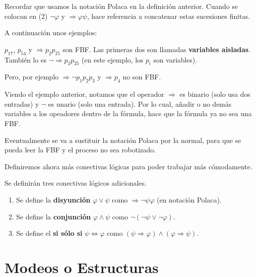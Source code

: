\documentclass[12pt]{report}
\newcounter{it}
\theoremstyle{largebreak}
\begin{document}
    \begin{obs}
        Recordar que usamos la notación Polaca en la definición anterior. Cuando se colocan en (2) $\neg\varphi$ y $\Rightarrow\varphi\psi$, hace referencia a concatenar estas sucesiones finitas.
    \end{obs}

    A continuación unos ejemplos:
    
    \begin{exa}
        $p_{17}$, $p_{54}$ y $\Rightarrow p_2p_{25}$ son FBF. Las primeras dos son llamadas \textbf{variables aisladas}. También lo es $\neg \Rightarrow p_2p_{25}$ (en este ejemplo, los $p_i$ son variables).

        Pero, por ejemplo $\Rightarrow \neg p_1 p_2 p_3$ y $\Rightarrow p_4$ no son FBF.
    \end{exa}

    Viendo el ejemplo anterior, notamos que el operador $\Rightarrow$ es binario (solo usa dos entradas) y $\neg$ es unario (solo una entrada). Por lo cual, añadir o no demás variables a los opeadores dentro de la fórmula, hace que la fórmula ya no sea una FBF.

    \begin{obs}
        Eventualmente se va a sustituir la notación Polaca por la normal, para que se pueda leer la FBF y el proceso no sea robotizado.
    \end{obs}

    Definiremos ahora más conectivas lógicas para poder trabajar más cómodamente.

    \begin{mydef}
        Se definirán tres conectivas lógicos adicionales.
        \begin{enumerate}
            \item Se define la \textbf{disyunción} $\varphi\lor\psi$ como $\Rightarrow\neg\psi\varphi$ (en notación Polaca).
            \item Se define la \textbf{conjunción} $\varphi\land\psi$ como $\neg(\neg\psi\lor\neg\varphi)$.
            \item Se define el \textbf{si sólo si} $\psi\iff\varphi$ como $(\psi\Rightarrow\varphi)\land(\varphi\Rightarrow\psi)$.
        \end{enumerate}
    \end{mydef}

    \section{Modeos o Estructuras}
\end{document}

